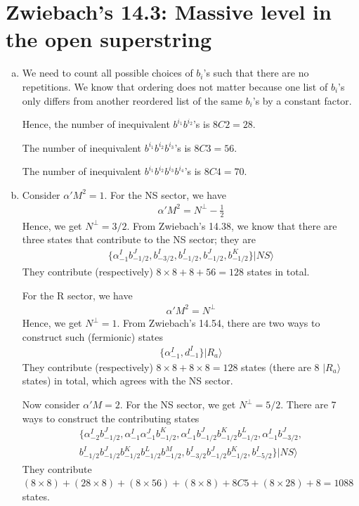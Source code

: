 \documentclass[11pt]{article}
\begin{document}
\section{Zwiebach's 14.3: Massive level in the open superstring}
\begin{enumerate} [(a)]
    \item We need to count all possible choices of $b_i$'s such that there are no repetitions. We know that ordering does not matter because one list of $b_i$'s only differs from another reordered list of the same $b_i$'s by a constant factor. 
    
    Hence, the number of inequivalent $b^{i_1} b^{i_2}$'s is $8C2 = 28$. 

    The number of inequivalent $b^{i_1}b^{i_2}b^{i_3}$'s is $8C3 = 56$. 
    
    The number of inequivalent $b^{i_1}b^{i_2}b^{i_3}b^{i_4}$'s is $8C4 = 70$. 

    \item Consider $\alpha' M^2 = 1$. For the NS sector, we have 
    \begin{align*}
        \alpha' M^2 = N^\perp - \frac{1}{2}
    \end{align*}
    Hence, we get $N^\perp = 3/2$. From Zwiebach's 14.38, we know that there are three states that contribute to the NS sector; they are 
    \begin{align*}
        \{ \alpha_{-1}^I b_{-1/2}^J, b^I_{-3/2}, b^I_{-1/2}, b^J_{-1/2}, b^K_{-1/2} \} |NS\rangle 
    \end{align*}
    They contribute (respectively) $8 \times 8 + 8 + 56 = 128$ states in total. 

    For the R sector, we have 
    \begin{align*}
        \alpha' M^2 = N^\perp 
    \end{align*}
    Hence, we get $N^\perp = 1$. From Zwiebach's 14.54, there are two ways to construct such (fermionic) states 
    \begin{align*}
        \{ \alpha_{-1}^I, d_{-1}^I \} |R_a \rangle 
    \end{align*}
    They contribute (respectively) $8 \times 8 + 8 \times 8 = 128$ states (there are 8 $|R_a\rangle$ states) in total, which agrees with the NS sector. 

    Now consider $\alpha' M = 2$. For the NS sector, we get $N^\perp = 5/2$. There are 7 ways to construct the contributing states 
    \begin{align*}
        \{ \alpha_{-2}^I b^J_{-1/2}, \alpha_{-1}^I \alpha_{-1}^J b^K_{-1/2}, \alpha_{-1}^I b^J_{-1/2}b^K_{-1/2}b^L_{-1/2}, \alpha_{-1}^I b^J_{-3/2}, \\
        b_{-1/2}^Ib_{-1/2}^Jb_{-1/2}^Kb_{-1/2}^Lb_{-1/2}^M, b_{-3/2}^I b_{-1/2}^J b_{-1/2}^K, b_{-5/2}^I\} |NS \rangle 
    \end{align*}
    They contribute $(8 \times 8) + (28 \times 8) + (8 \times 56) + (8 \times 8) + 8C5 + (8 \times 28) + 8 = 1088$ states. 


\end{enumerate}
\end{document}
